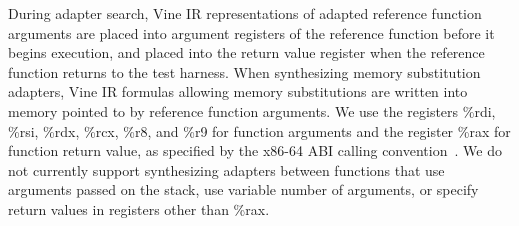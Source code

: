 %
%

%
During adapter search, Vine IR representations of adapted reference function arguments are placed into argument registers of the reference function before it begins execution, and placed into the return value register when the reference function returns to the test harness.
%
When synthesizing memory substitution adapters, Vine IR formulas allowing memory substitutions are written into memory pointed to by reference function arguments.
%
We use the registers \%rdi, \%rsi, \%rdx, \%rcx, \%r8, and \%r9 for function arguments and the register \%rax for function return value, as specified by the x86-64 ABI calling convention~\cite{x64-abi}.
%
We do not currently support synthesizing adapters between functions that use arguments passed on the stack, use variable number of arguments, or specify return values in registers other than \%rax.
%
%
%
%
%
